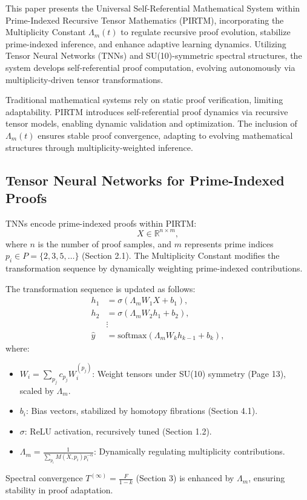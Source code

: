 \documentclass{article}
\theoremstyle{plain}
\begin{document}
This paper presents the Universal Self-Referential Mathematical System within Prime-Indexed Recursive Tensor Mathematics (PIRTM), incorporating the Multiplicity Constant \( \Lambda_m(t) \) to regulate recursive proof evolution, stabilize prime-indexed inference, and enhance adaptive learning dynamics. Utilizing Tensor Neural Networks (TNNs) and SU(10)-symmetric spectral structures, the system develops self-referential proof computation, evolving autonomously via multiplicity-driven tensor transformations.

Traditional mathematical systems rely on static proof verification, limiting adaptability. PIRTM introduces self-referential proof dynamics via recursive tensor models, enabling dynamic validation and optimization. The inclusion of \( \Lambda_m(t) \) ensures stable proof convergence, adapting to evolving mathematical structures through multiplicity-weighted inference.

\subsection{Tensor Neural Networks for Prime-Indexed Proofs}
TNNs encode prime-indexed proofs within PIRTM:
\begin{equation}
X \in \mathbb{R}^{n \times m},
\end{equation}
where \( n \) is the number of proof samples, and \( m \) represents prime indices \( p_i \in P = \{2, 3, 5, \dots\} \) (Section 2.1). The Multiplicity Constant modifies the transformation sequence by dynamically weighting prime-indexed contributions.

The transformation sequence is updated as follows:
\begin{align}
h_1 &= \sigma(\Lambda_m W_1 X + b_1), \\
h_2 &= \sigma(\Lambda_m W_2 h_1 + b_2), \\
&\vdots \\
\hat{y} &= \text{softmax}(\Lambda_m W_k h_{k-1} + b_k),
\end{align}
where:
\begin{itemize}
    \item \( W_i = \sum_{p_j} c_{p_j} W_i^{(p_j)} \): Weight tensors under SU(10) symmetry (Page 13), scaled by \( \Lambda_m \).
    \item \( b_i \): Bias vectors, stabilized by homotopy fibrations (Section 4.1).
    \item \( \sigma \): ReLU activation, recursively tuned (Section 1.2).
    \item \( \Lambda_m = \frac{1}{\sum_{p_i} M(X, p_i) p_i^{-\alpha}} \): Dynamically regulating multiplicity contributions.
\end{itemize}
Spectral convergence \( T^{(\infty)} = \frac{F}{1 - k} \) (Section 3) is enhanced by \( \Lambda_m \), ensuring stability in proof adaptation.
\end{document}
